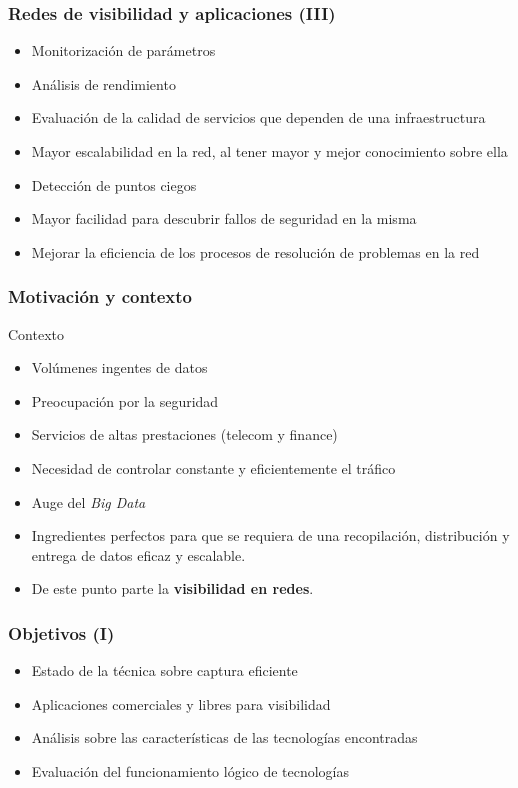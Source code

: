 \documentclass{beamer}
\begin{document}
\begin{frame}
\frametitle{Redes de visibilidad y aplicaciones (III)}

\begin{itemize}
\item Monitorización de parámetros
\item Análisis de rendimiento
\item Evaluación de la calidad de servicios que dependen de una infraestructura
\item Mayor escalabilidad en la red, al tener mayor y mejor conocimiento sobre ella
\item Detección de puntos ciegos
\item Mayor facilidad para descubrir fallos de seguridad en la misma
\item Mejorar la eficiencia de los procesos de resolución de problemas en la red
\end{itemize}

\end{frame}



\begin{frame}
\frametitle{Motivación y contexto}
\begin{block}{Contexto}
\begin{itemize}
	\item Volúmenes ingentes de datos
	\item Preocupación por la seguridad
	\item Servicios de altas prestaciones (telecom y finance)
	\item Necesidad de controlar constante y eficientemente el tráfico
	\item Auge del \textit{Big Data}
\end{itemize}
\end{block}

\begin{itemize}
	\item Ingredientes perfectos para que se requiera de una recopilación, distribución y entrega de datos eficaz y escalable.
	\item De este punto parte la \textbf{visibilidad en redes}.
\end{itemize}

\end{frame}

\begin{frame}
\frametitle{Objetivos (I)}

\begin{itemize}
	\item Estado de la técnica sobre captura eficiente
	\item Aplicaciones comerciales y libres para visibilidad
	\item Análisis sobre las características de las tecnologías encontradas
	\item Evaluación del funcionamiento lógico de tecnologías
\end{itemize}

\end{frame}
\end{document}
